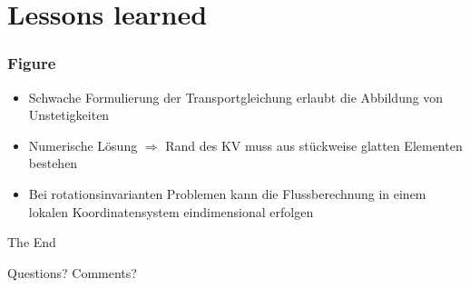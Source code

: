 \documentclass[
	11pt, %
	aspectratio=169, %
]{beamer}
\begin{document}


 \section{Lessons learned}

 \begin{frame}
 	\frametitle{Figure}

	\begin{itemize}
		\item Schwache Formulierung der Transportgleichung erlaubt die Abbildung von Unstetigkeiten
		\item Numerische Lösung $\Rightarrow$ Rand des KV muss aus stückweise glatten Elementen bestehen
		\item Bei rotationsinvarianten Problemen kann die Flussberechnung in einem lokalen Koordinatensystem eindimensional erfolgen
	\end{itemize}
 \end{frame}



\begin{frame}[plain] %
	 	\begin{center}
		{\Huge The End}
		
		\bigskip\bigskip %
		
		{\LARGE Questions? Comments?}
	\end{center}
 \end{frame}

\end{document}
